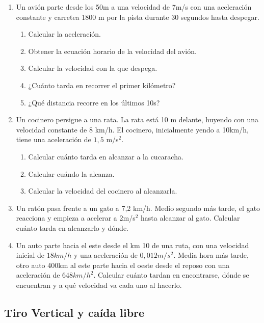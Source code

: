 \begin{enumerate}
    \item Un avión parte desde los 50m a una velocidad de 7m/s con una aceleración constante y carretea 1800 m por la pista durante 30 segundos hasta despegar.

    \begin{enumerate}
    \item Calcular la aceleración. %
    \item Obtener la ecuación horario de la velocidad del avión.
    \item Calcular la velocidad con la que despega. %
    \item ¿Cuánto tarda en recorrer el primer kilómetro? %
    \item ¿Qué distancia recorre en los últimos 10s?
    \end{enumerate}

    \item Un cocinero persigue a una rata. La rata está 10 m delante, huyendo con una velocidad constante de 8 km/h. El cocinero, inicialmente yendo a 10km/h, tiene una aceleración de $1,5$ m/s$^2$.
    \begin{enumerate}
        \item Calcular cuánto tarda en alcanzar a la cucaracha.
        \item Calcular cuándo la alcanza.
        \item Calcular la velocidad del cocinero al alcanzarla.
    \end{enumerate}

    \item Un ratón pasa frente a un gato a 7,2 km/h. Medio segundo más tarde, el gato reacciona y empieza a acelerar a 2m/s$^2$ hasta alcanzar al gato. Calcular cuánto tarda en alcanzarlo y dónde.


    \item Un auto parte hacia el este desde el km 10 de una ruta, con una velocidad inicial de $18 km/h$ y una aceleración de $0,012 m/s^2$. Media hora más tarde, otro auto 400km al este parte hacia el oeste desde el reposo con una aceleración de $648 km/h^2$. Calcular cuánto tardan en encontrarse, dónde se encuentran y a qué velocidad va cada uno al hacerlo.
\end{enumerate}


\newpage
\subsection{Tiro Vertical y caída libre}

